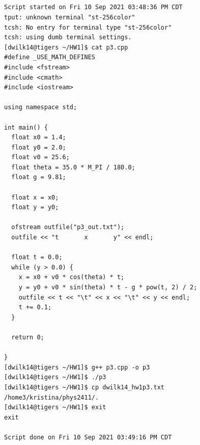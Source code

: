 \documentclass{article}
\begin{document}
\subsection{}
\begin{verbatim}
Script started on Fri 10 Sep 2021 03:48:36 PM CDT
tput: unknown terminal "st-256color"
tcsh: No entry for terminal type "st-256color"
tcsh: using dumb terminal settings.
[dwilk14@tigers ~/HW1]$ cat p3.cpp
#define _USE_MATH_DEFINES
#include <fstream>
#include <cmath>
#include <iostream>

using namespace std;

int main() {
  float x0 = 1.4;
  float y0 = 2.0;
  float v0 = 25.6;
  float theta = 35.0 * M_PI / 180.0;
  float g = 9.81;

  float x = x0;
  float y = y0;

  ofstream outfile("p3_out.txt");
  outfile << "t       x       y" << endl;

  float t = 0.0;
  while (y > 0.0) {
    x = x0 + v0 * cos(theta) * t;
    y = y0 + v0 * sin(theta) * t - g * pow(t, 2) / 2;
    outfile << t << "\t" << x << "\t" << y << endl;
    t += 0.1;
  }

  return 0;

}
[dwilk14@tigers ~/HW1]$ g++ p3.cpp -o p3
[dwilk14@tigers ~/HW1]$ ./p3
[dwilk14@tigers ~/HW1]$ cp dwilk14_hw1p3.txt /home3/kristina/phys2411/.
[dwilk14@tigers ~/HW1]$ exit
exit

Script done on Fri 10 Sep 2021 03:49:16 PM CDT
\end{verbatim}
\end{document}

